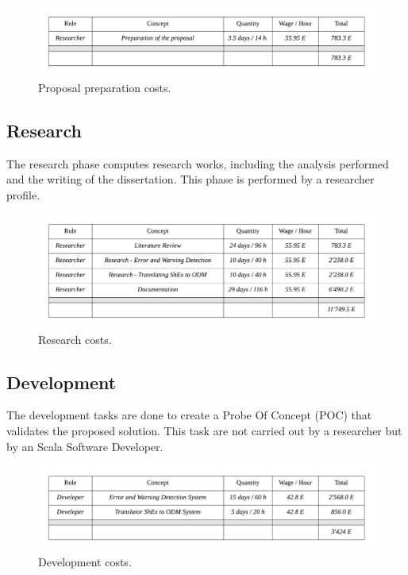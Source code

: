 \begin{figure}[h!]
    \includegraphics[width=\textwidth]{images/budget-proposal.pdf}
    \centering
	\caption[Proposal preparation costs]{Proposal preparation costs.}
    \label{fig:budget-proposal}
\end{figure}

\subsection{Research}
The research phase computes research works, including the analysis performed and the writing of the dissertation.
This phase is performed by a researcher profile.

\begin{figure}[h!]
    \includegraphics[width=\textwidth]{images/budget-research.pdf}
    \centering
	\caption[Research costs]{Research costs.}
    \label{fig:budget-research}
\end{figure}

\subsection{Development}
The development tasks are done to create a Probe Of Concept (POC) that validates the proposed solution. This task are not carried out by a researcher
but by an Scala Software Developer.

\begin{figure}[h!]
    \includegraphics[width=\textwidth]{images/budget-development.pdf}
    \centering
	\caption[Development costs]{Development costs.}
    \label{fig:budget-development}
\end{figure}

